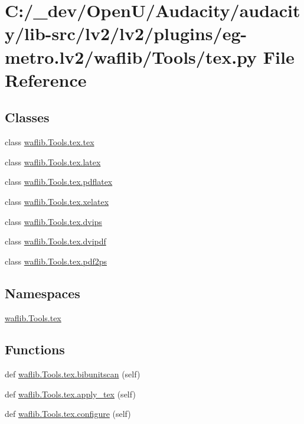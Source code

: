 \hypertarget{lv2_2plugins_2eg-metro_8lv2_2waflib_2_tools_2tex_8py}{}\section{C\+:/\+\_\+dev/\+Open\+U/\+Audacity/audacity/lib-\/src/lv2/lv2/plugins/eg-\/metro.lv2/waflib/\+Tools/tex.py File Reference}
\label{lv2_2plugins_2eg-metro_8lv2_2waflib_2_tools_2tex_8py}
\subsection*{Classes}
\begin{DoxyCompactItemize}
\item 
class \hyperlink{classwaflib_1_1_tools_1_1tex_1_1tex}{waflib.\+Tools.\+tex.\+tex}
\item 
class \hyperlink{classwaflib_1_1_tools_1_1tex_1_1latex}{waflib.\+Tools.\+tex.\+latex}
\item 
class \hyperlink{classwaflib_1_1_tools_1_1tex_1_1pdflatex}{waflib.\+Tools.\+tex.\+pdflatex}
\item 
class \hyperlink{classwaflib_1_1_tools_1_1tex_1_1xelatex}{waflib.\+Tools.\+tex.\+xelatex}
\item 
class \hyperlink{classwaflib_1_1_tools_1_1tex_1_1dvips}{waflib.\+Tools.\+tex.\+dvips}
\item 
class \hyperlink{classwaflib_1_1_tools_1_1tex_1_1dvipdf}{waflib.\+Tools.\+tex.\+dvipdf}
\item 
class \hyperlink{classwaflib_1_1_tools_1_1tex_1_1pdf2ps}{waflib.\+Tools.\+tex.\+pdf2ps}
\end{DoxyCompactItemize}
\subsection*{Namespaces}
\begin{DoxyCompactItemize}
\item 
 \hyperlink{namespacewaflib_1_1_tools_1_1tex}{waflib.\+Tools.\+tex}
\end{DoxyCompactItemize}
\subsection*{Functions}
\begin{DoxyCompactItemize}
\item 
def \hyperlink{namespacewaflib_1_1_tools_1_1tex_a0995543408e2b3f7705b148ffcce08b3}{waflib.\+Tools.\+tex.\+bibunitscan} (self)
\item 
def \hyperlink{namespacewaflib_1_1_tools_1_1tex_ac13f6c937ac7ea4af8d30e2a71f312f0}{waflib.\+Tools.\+tex.\+apply\+\_\+tex} (self)
\item 
def \hyperlink{namespacewaflib_1_1_tools_1_1tex_a63e6ed812ce192be695521518632025a}{waflib.\+Tools.\+tex.\+configure} (self)
\end{DoxyCompactItemize}
